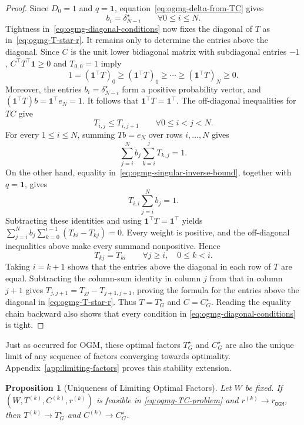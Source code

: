 \documentclass[11pt]{article}
\newtheorem{proposition}[thm]{Proposition}
\begin{document}
\begin{proof}
Since $D_0=1$ and $q=\mathbf1$, equation~\eqref{eq:ogmg-delta-from-TC} gives
\[
b_i=\delta_{N-i}^\star
\qquad \forall 0\leq i\leq N.
\]
Tightness in~\eqref{eq:ogmg-diagonal-conditions} now fixes the diagonal of
$T$ as in~\eqref{eq:ogmg-T-star-r}. It remains only to determine the
entries above the diagonal. Since $C$ is the unit lower bidiagonal matrix with subdiagonal entries $-1$,
$C^\top T^\top\mathbf1\geq0$ and $T_{0,0}=1$ imply
\[
1=(\mathbf1^\top T)_0\geq(\mathbf1^\top T)_1\geq\cdots
\geq(\mathbf1^\top T)_N\geq0.
\]
Moreover, the entries $b_i=\delta_{N-i}^\star$ form a positive probability vector, and $(\mathbf1^\top T)b=\mathbf1^\top e_N=1$.
It follows that $\mathbf1^\top T=\mathbf1^\top$. The off-diagonal
inequalities for $TC$ give
\[
T_{i,j}\leq T_{i,j+1}
\qquad \forall 0\leq i<j<N.
\]
For every $1\leq i\leq N$, summing $Tb=e_N$ over rows $i,\dots,N$
gives
\[
    \sum_{j=i}^N b_j\sum_{k=i}^jT_{k,j}=1.
\]
On the other hand, equality in~\eqref{eq:ogmg-singular-inverse-bound}, together
with $q=\mathbf1$, gives
\[
    T_{i,i}\sum_{j=i}^N b_j=1.
\]
Subtracting these identities and using $\mathbf1^\top T=\mathbf1^\top$
yields $\sum_{j=i}^N b_j
\sum_{k=0}^{i-1}(T_{ki}-T_{kj})=0$.
Every weight is positive, and the off-diagonal inequalities above make every
summand nonpositive. Hence
\[
T_{kj}=T_{ki}
\qquad \forall j\geq i,\quad 0\leq k<i.
\]
Taking $i=k+1$ shows that the entries above the diagonal in each row of $T$ are equal. Subtracting
the column-sum identity in column $j$ from that in column $j+1$ gives
$T_{j,j+1}=T_{jj}-T_{j+1,j+1}$, proving the formula for the entries above the diagonal in
\eqref{eq:ogmg-T-star-r}. Thus $T=T_G^\star$ and $C=C_G^\star$.
Reading the equality chain backward also shows that every condition in
\eqref{eq:ogmg-diagonal-conditions} is tight.
\end{proof}

Just as occurred for OGM, these optimal factors $T_G^\star$ and $C_G^\star$ are also the unique limit of any sequence of factors converging towards optimality. Appendix~\ref{app:limiting-factors} proves this stability extension.
\begin{proposition}[Uniqueness of Limiting Optimal Factors]
\label{prop:ogmg-limiting-factors}
Let $W$ be fixed. If $(W,T^{(k)},C^{(k)},r^{(k)})$ is feasible in
\eqref{eq:ogmg-TC-problem} and $r^{(k)}\to r_\mathtt{OGM}$, then $T^{(k)}\to T_G^\star$ and $C^{(k)}\to C_G^\star$.
\end{proposition}
\end{document}
